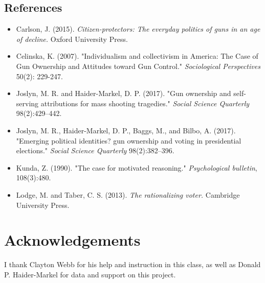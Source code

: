 \documentclass[a0,landscape]{a0poster}
\begin{document}
\begin{multicols}{4}
\subsection*{References}
\small
\begin{itemize}
\item Carlson, J. (2015). \textit{Citizen-protectors: The everyday politics of guns in an age of decline.} Oxford University Press.
\item Celinska, K. (2007). "Individualism and collectivism in America: The Case of Gun Ownership and Attitudes toward Gun Control." \textit{Sociological Perspectives} 50(2): 229-247.
\item Joslyn, M. R. and Haider-Markel, D. P. (2017). "Gun ownership and self-serving attributions for mass shooting tragedies." \textit{Social Science Quarterly} 98(2):429–442.
\item Joslyn, M. R., Haider-Markel, D. P., Baggs, M., and Bilbo, A. (2017). "Emerging political identities? gun ownership and voting in presidential elections." \textit{Social Science Quarterly} 98(2):382–396.
\item Kunda, Z. (1990). "The case for motivated reasoning." \textit{Psychological bulletin}, 108(3):480.
\item Lodge, M. and Taber, C. S. (2013). \textit{The rationalizing voter.} Cambridge University Press.
\end{itemize}


\section*{Acknowledgements}

I thank Clayton Webb for his help and instruction in this class, as well as Donald P. Haider-Markel for data and support on this project.


\end{multicols}
\end{document}
